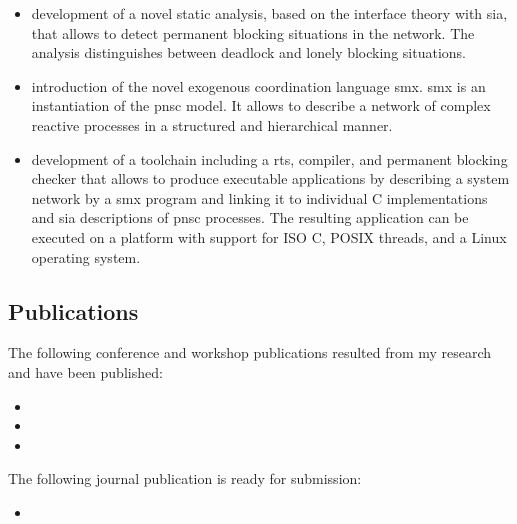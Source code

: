 \begin{itemize}
    \item development of a novel static analysis, based on the interface theory with \gls{sia}, that allows to detect permanent blocking situations in the network.
        The analysis distinguishes between deadlock and lonely blocking situations.
    \item introduction of the novel exogenous coordination language \gls*{smx}.
        \Gls*{smx} is an instantiation of the \gls{pnsc} model.
        It allows to describe a network of complex reactive processes in a structured and hierarchical manner.
    \item development of a toolchain including a \gls{rts}, compiler, and permanent blocking checker that allows to produce executable applications by describing a system network by a \gls*{smx} program and linking it to individual C implementations and \gls{sia} descriptions of \gls{pnsc} processes.
        The resulting application can be executed on a platform with support for ISO C, POSIX threads, and a Linux operating system.
\end{itemize}

\subsection{Publications}
The following conference and workshop publications resulted from my research and have been published:
\begin{itemize}
    \item {}
    \item {}
    \item {}
\end{itemize}
The following journal publication is ready for submission:
\begin{itemize}
    \item {}
\end{itemize}


